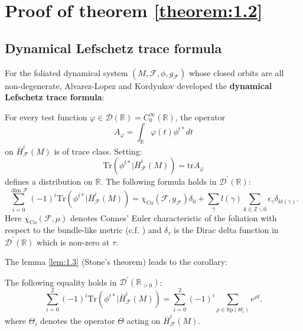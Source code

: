 \section{Proof of theorem \ref{theorem:1.2}}

    \subsection{Dynamical Lefschetz trace formula}
    For the foliated dynamical system $(M,\mathcal{F},\phi, g_{\mathcal{F}})$ whose closed orbits are all non-degenerate, Alvarez-Lopez and Kordyukov developed the \textbf{dynamical Lefschetz trace formula}:
    \begin{proposition}
    For every test function $\varphi\in\mathcal{D}(\mathbb{R})=C^{\infty}_{0}(\mathbb{R})$, the operator
    \begin{equation*}
        A_{\varphi}=\int_{\mathbb{R}}\varphi(t)\phi^{t*}dt
    \end{equation*}
    on $\bar{H}^{i}_{\mathcal{F}}(M)$ is of trace class.
    Setting:
    \begin{equation*}
        \mathrm{Tr}(\phi^{t*}|\bar{H}^{i}_{\mathcal{F}}(M))
        =\mathrm{tr}A_{\varphi}
    \end{equation*}
    defines a distribution on $\mathbb{R}$.
    The following formula holds in $\mathcal{D}^{'}(\mathbb{R})$:
    \begin{equation*}
        \sum_{i=0}^{\dim{\mathcal{F}}}(-1)^{i}\mathrm{Tr}(\phi^{t*}|\bar{H}^{i}_{\mathcal{F}}(M))
        =\chi_{\mathrm{Co}}(\mathcal{F},g_{\mathcal{F}})\delta_{0}
        +\sum_{\gamma}l(\gamma)\sum_{k\in\mathbb{Z}\backslash0}\epsilon_{\gamma}\delta_{kl(\gamma)}.
    \end{equation*}
    Here $\chi_{\mathrm{Co}}(\mathcal{F},\mu)$ denotes Connes' Euler characteristic of the foliation with respect to the bundle-like metric (c.f. \cite{connes2000noncommutative}) and $\delta_{\tau}$ is the Dirac delta function in $\mathcal{D}^{'}(\mathbb{R})$ which is non-zero at $\tau$.
    \end{proposition}
    
    The lemma \ref{lem:1.3} (Stone's theorem) leads to the corollary:
    \begin{corollary} \label{cor:2.1.1.}
    The following equality holds in $\mathcal{D}^{'}(\mathbb{R}_{>0})$:
    \begin{equation*}
        \sum_{i=0}^{2}(-1)^{i}\mathrm{Tr}(\phi^{t*}|\bar{H}^{i}_{\mathcal{F}}(M))
        =\sum_{i=0}^{2}(-1)^{i}\sum_{\rho\in\mathrm{Sp}(\Theta_{i})}e^{\rho{t}}.
    \end{equation*}
    where $\Theta_{i}$ denotes the operator $\Theta$ acting on $\bar{H}^{i}_{\mathcal{F}}(M)$.
    \end{corollary}


